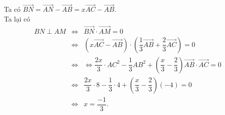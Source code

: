 \begin{bt}
{\begin{listEX}
			\item Ta có $\overrightarrow{BN}=\overrightarrow{AN}-\overrightarrow{AB}=x\overrightarrow{AC}-\overrightarrow{AB}$.\\
			Ta lại có 
			\begin{eqnarray*}
				BN \perp AM &\Leftrightarrow&\overrightarrow{BN} \cdot \overrightarrow{AM} =0
				\\&\Leftrightarrow&\left(x\overrightarrow{AC}-\overrightarrow{AB}\right)\cdot \left(\dfrac{1}{3}\overrightarrow{AB}+\dfrac{2}{3}\overrightarrow{AC}\right)=0
				\\&\Leftrightarrow&
				\Leftrightarrow
				\dfrac{2x}{3}\cdot AC^2 - \dfrac{1}{3}AB^2 +\left(\dfrac{x}{3}-\dfrac{2}{3}\right) \overrightarrow{AB} \cdot \overrightarrow{AC}=0
				\\&\Leftrightarrow&	\dfrac{2x}{3}\cdot8 - \dfrac{1}{3}\cdot4 +\left(\dfrac{x}{3}-\dfrac{2}{3}\right) (-4)=0 \\&\Leftrightarrow&	
				x=\dfrac{-1}{3}.
			\end{eqnarray*}
		\end{listEX}
	}
\end{bt}

